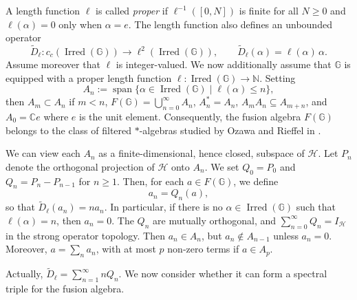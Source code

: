 \documentclass[12pt, reqno]{amsart}
\theoremstyle{definition}
\theoremstyle{remark}
\numberwithin{equation}{section}
\begin{document}
A length function $\ell$ is called \emph{proper} if 
$\ell^{-1}([0,N])$ is finite for all $N \geq 0$ and 
$\ell(\alpha) = 0$ only when $\alpha = e$.
The length function also defines an unbounded operator 
\[
\tilde{D}_\ell : c_c(\operatorname{Irred}(\mathbb{G})) \longrightarrow 
\ell^2(\operatorname{Irred}(\mathbb{G})),\qquad 
\tilde{D}_\ell(\alpha) = \ell(\alpha)\,\alpha.
\]
Assume moreover that $\ell$ is integer-valued.
We now additionally assume that $\mathbb{G}$ is equipped with a proper 
length function $\ell \colon \operatorname{Irred}(\mathbb{G}) \to 
\mathbb{N}$. Setting 
\[
A_{n} := \operatorname{span}\{\alpha \in \operatorname{Irred}(\mathbb{G}) 
\mid \ell(\alpha) \leqslant n\},
\]
then $A_m \subset A_n$ if $m < n$, 
$F(\mathbb{G}) = \bigcup_{n=0}^{\infty} A_n$, $A_n^* = A_n$, 
$A_m A_n \subseteq A_{m+n}$, and $A_0 = \mathbb{C}e$ where $e$ is the unit element. Consequently, 
the fusion algebra $F(\mathbb{G})$ belongs to the class of filtered 
$*$-algebras studied by Ozawa and Rieffel in \cite{14}.

We can view each $A_n$ as a finite-dimensional, hence closed, subspace 
of $\mathcal{H}$. Let $P_n$ denote the orthogonal projection of 
$\mathcal{H}$ onto $A_n$. We set $Q_0 = P_0$ and $Q_n = P_n - P_{n-1}$ for $n \ge 1$. Then, for each $a \in F(\mathbb{G})$, we define
\[
a_n = Q_n(a),
\]
so that $\tilde{D}_\ell(a_n) = n a_n$. In particular, if there is no $\alpha \in \operatorname{Irred}(\mathbb{G})$ such that $\ell(\alpha)=n$, then $a_n = 0$.
 The $Q_n$ are mutually orthogonal, and 
$\sum_{n=0}^\infty Q_n = I_{\mathcal{H}}$ in the strong operator 
topology. Then $a_n \in A_n$, but $a_n \notin A_{n-1}$ unless 
$a_n = 0$. Moreover, $a = \sum_n a_n$, with at most $p$ non‑zero terms 
if $a \in A_p$.

Actually, $\tilde{D}_\ell = \sum_{n=1}^\infty n Q_n$. We now consider 
whether it can form a spectral triple for the fusion algebra.
\end{document}
